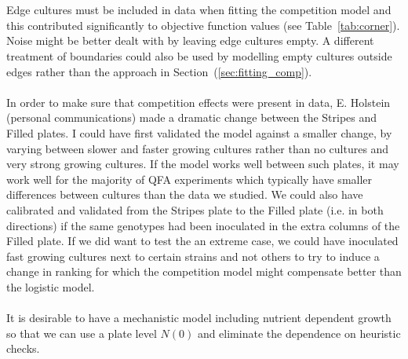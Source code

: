 \\\\
Edge cultures must be included in data when fitting the competition
model and this contributed significantly to objective function values
(see Table~\ref{tab:corner}). Noise might be better dealt with by
leaving edge cultures empty. A different treatment of boundaries could
also be used by modelling empty cultures outside edges rather than the
approach in Section~(\ref{sec:fitting_comp}).
\\\\
In order to make sure that competition effects were present in data,
E. Holstein (personal communications) made a dramatic change between
the Stripes and Filled plates. I could have first validated the model
against a smaller change, by varying between slower and faster growing
cultures rather than no cultures and very strong growing cultures. If
the model works well between such plates, it may work well for the
majority of QFA experiments which typically have smaller differences
between cultures than the data we studied. We could also have
calibrated and validated from the Stripes plate to the Filled plate
(i.e. in both directions) if the same genotypes had been inoculated in
the extra columns of the Filled plate. If we did want to test the an
extreme case, we could have inoculated fast growing cultures next to
certain strains and not others to try to induce a change in ranking
for which the competition model might compensate better than the
logistic model.
\\\\
It is desirable to have a mechanistic model including nutrient
dependent growth so that we can use a plate level \(N(0)\) and
eliminate the dependence on heuristic checks.


